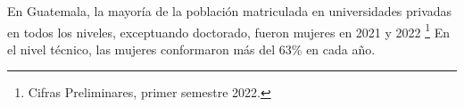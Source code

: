 En Guatemala, la mayoría de la población matriculada en universidades privadas en todos los niveles, exceptuando doctorado, fueron mujeres en 2021 y 2022 \footnote{Cifras Preliminares, primer semestre 2022.} En el nivel técnico, las mujeres conformaron más del 63\% en cada año. 